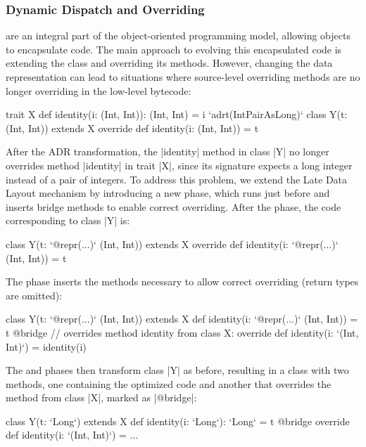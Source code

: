 \subsubsection*{Dynamic Dispatch and Overriding}
\label{sec:ildl:language-overriding}
are an integral part of the object-oriented programming model, allowing objects to encapsulate code. The main approach to evolving this encapsulated code is extending the class and overriding its methods. However, changing the data representation can lead to situations where source-level overriding methods are no longer overriding in the low-level bytecode:

\begin{lstlisting-nobreak}
trait X {
  def identity(i: (Int, Int)): (Int, Int) = i
}
`adrt(IntPairAsLong)` {
  class Y(t: (Int, Int)) extends X {
    override def identity(i: (Int, Int)) = t
  }
}
\end{lstlisting-nobreak}

After the ADR transformation, the |identity| method in class |Y| no longer overrides method |identity| in trait |X|, since its signature expects a long integer instead of a pair of integers. To address this problem, we extend the Late Data Layout mechanism by introducing a new \bridge{} phase, which runs just before \coerce{} and inserts bridge methods to enable correct overriding. After the \inject{} phase, the code corresponding to class |Y| is:

\begin{lstlisting-nobreak}
class Y(t: `@repr(...)` (Int, Int)) extends X {
  override def identity(i: `@repr(...)` (Int, Int)) = t
}
\end{lstlisting-nobreak}

The \bridge{} phase inserts the methods necessary to allow correct overriding (return types are omitted):

\begin{lstlisting-nobreak}
class Y(t: `@repr(...)` (Int, Int)) extends X {
  def identity(i: `@repr(...)` (Int, Int)) = t
  @bridge // overrides method identity from class X:
  override def identity(i: `(Int, Int)`) = identity(i)
}
\end{lstlisting-nobreak}

The \coerce{} and \commit{} phases then transform class |Y| as before, resulting in a class with two methods, one containing the optimized code and another that overrides the method from class |X|, marked as |@bridge|:

\begin{lstlisting-nobreak}
class Y(t: `Long`) extends X {
  def identity(i: `Long`): `Long` = t
  @bridge override def identity(i: `(Int, Int)`) = ...
}
\end{lstlisting-nobreak}

